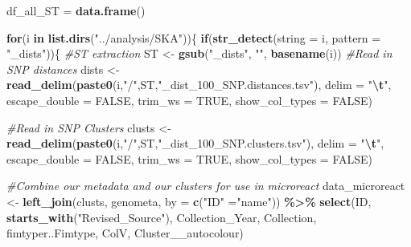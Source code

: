 \documentclass[
]{article}
\newenvironment{Shaded}{\begin{snugshade}}{\end{snugshade}}
\newcommand{\AttributeTok}[1]{\textcolor[rgb]{0.13,0.29,0.53}{#1}}
\newcommand{\CommentTok}[1]{\textcolor[rgb]{0.56,0.35,0.01}{\textit{#1}}}
\newcommand{\ConstantTok}[1]{\textcolor[rgb]{0.56,0.35,0.01}{#1}}
\newcommand{\ControlFlowTok}[1]{\textcolor[rgb]{0.13,0.29,0.53}{\textbf{#1}}}
\newcommand{\FunctionTok}[1]{\textcolor[rgb]{0.13,0.29,0.53}{\textbf{#1}}}
\newcommand{\NormalTok}[1]{#1}
\newcommand{\OtherTok}[1]{\textcolor[rgb]{0.56,0.35,0.01}{#1}}
\newcommand{\SpecialCharTok}[1]{\textcolor[rgb]{0.81,0.36,0.00}{\textbf{#1}}}
\newcommand{\StringTok}[1]{\textcolor[rgb]{0.31,0.60,0.02}{#1}}
\begin{document}
\begin{Shaded}
\begin{Highlighting}[]
\NormalTok{df\_all\_ST }\OtherTok{=} \FunctionTok{data.frame}\NormalTok{()}

\ControlFlowTok{for}\NormalTok{(i }\ControlFlowTok{in} \FunctionTok{list.dirs}\NormalTok{(}\StringTok{"../analysis/SKA"}\NormalTok{))\{}
        \ControlFlowTok{if}\NormalTok{(}\FunctionTok{str\_detect}\NormalTok{(}\AttributeTok{string =}\NormalTok{ i, }\AttributeTok{pattern =} \StringTok{"\_dists"}\NormalTok{))\{}
                \CommentTok{\#ST extraction}
\NormalTok{                ST }\OtherTok{\textless{}{-}} \FunctionTok{gsub}\NormalTok{(}\StringTok{"\_dists"}\NormalTok{, }\StringTok{""}\NormalTok{, }\FunctionTok{basename}\NormalTok{(i))}
                \CommentTok{\#Read in SNP distances}
\NormalTok{                dists }\OtherTok{\textless{}{-}} \FunctionTok{read\_delim}\NormalTok{(}\FunctionTok{paste0}\NormalTok{(i,}\StringTok{"/"}\NormalTok{,ST,}\StringTok{"\_dist\_100\_SNP.distances.tsv"}\NormalTok{), }
                    \AttributeTok{delim =} \StringTok{"}\SpecialCharTok{\textbackslash{}t}\StringTok{"}\NormalTok{, }\AttributeTok{escape\_double =} \ConstantTok{FALSE}\NormalTok{, }
                    \AttributeTok{trim\_ws =} \ConstantTok{TRUE}\NormalTok{, }\AttributeTok{show\_col\_types =} \ConstantTok{FALSE}\NormalTok{)}
                
                \CommentTok{\#Read in SNP Clusters}
\NormalTok{                clusts }\OtherTok{\textless{}{-}} \FunctionTok{read\_delim}\NormalTok{(}\FunctionTok{paste0}\NormalTok{(i,}\StringTok{"/"}\NormalTok{,ST,}\StringTok{"\_dist\_100\_SNP.clusters.tsv"}\NormalTok{), }
                    \AttributeTok{delim =} \StringTok{"}\SpecialCharTok{\textbackslash{}t}\StringTok{"}\NormalTok{, }\AttributeTok{escape\_double =} \ConstantTok{FALSE}\NormalTok{, }
                    \AttributeTok{trim\_ws =} \ConstantTok{TRUE}\NormalTok{, }\AttributeTok{show\_col\_types =} \ConstantTok{FALSE}\NormalTok{)}
                
                
                \CommentTok{\#Combine our metadata and our clusters for use in microreact}
\NormalTok{                data\_microreact }\OtherTok{\textless{}{-}} \FunctionTok{left\_join}\NormalTok{(clusts, genometa, }\AttributeTok{by =} \FunctionTok{c}\NormalTok{(}\StringTok{"ID"} \OtherTok{=}\StringTok{"name"}\NormalTok{)) }\SpecialCharTok{\%\textgreater{}\%} \FunctionTok{select}\NormalTok{(ID, }\FunctionTok{starts\_with}\NormalTok{(}\StringTok{"Revised\_Source"}\NormalTok{), Collection\_Year, Collection, fimtyper..Fimtype, ColV, Cluster\_\_autocolour)}
                

\end{Highlighting}
\end{Shaded}
\end{document}
